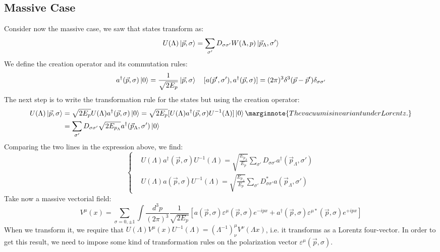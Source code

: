 \documentclass[../main.tex]{subfiles}
\begin{document}
\subsection{Massive Case}
Consider now the massive case, we saw that states transform as:
\[
U(\Lambda)\ket{\vec{p},\sigma}=\sum_{\sigma'}D_{\sigma\sigma'}W(\Lambda,p)\ket{\vec{p}_\Lambda,\sigma'}
\]
We define the creation operator and its commutation rules:
\[
a^\dagger(\vec{p},\sigma)\ket{0}=\frac{1}{\sqrt{2E_p}}\ket{\vec{p},\sigma} \quad [a(\vec{p}',\sigma'),a^\dagger(\vec{p},\sigma)]=(2\pi)^3\delta^3(\vec{p}-\vec{p}')\delta_{\sigma\sigma'}
\]
The next step is to write the transformation rule for the states but using the creation operator:
\begin{align*}
U(\Lambda)\ket{\vec{p},\sigma}&=\sqrt{2E_p}U(\Lambda)a^\dagger(\vec{p},\sigma)\ket{0}=\sqrt{2E_p}[U(\Lambda)a^\dagger(\vec{p},\sigma)U^{-1}(\Lambda)]\ket{0}\marginnote{The vacuum is invariant under Lorentz.}\\
&=\sum_{\sigma'}D_{\sigma\sigma'}\sqrt{2E_{p_\Lambda}}a^\dagger(\vec{p}_\Lambda,\sigma')\ket{0}
\end{align*}
Comparing the two lines in the expression above, we find:
\[
\left\{
\begin{aligned}
&U(\Lambda)a^\dagger(\vec{p},\sigma)U^{-1}(\Lambda)=\sqrt{\frac{E_{p_\Lambda}}{E_p}}\sum_{\sigma'}D_{\sigma\sigma'}a^\dagger(\vec{p}_\Lambda,\sigma')\\
&U(\Lambda)a(\vec{p},\sigma)U^{-1}(\Lambda)=\sqrt{\frac{E_{p_\Lambda}}{E_p}}\sum_{\sigma'}D_{\sigma\sigma'}^*a(\vec{p}_\Lambda,\sigma')
\end{aligned}
\right.
\]
Take now a massive vectorial field:
\[
V^\mu(x)=\sum_{\sigma=0,\pm1}\int\frac{d^3p}{(2\pi)^3}\frac{1}{\sqrt{2E_p}}\left[a(\vec{p},\sigma)\varepsilon^\mu(\vec{p},\sigma)e^{-ipx}+a^\dagger(\vec{p},\sigma)\varepsilon^{\mu*}(\vec{p},\sigma)e^{+ipx}\right]
\]
When we transform it, we require that $U(\Lambda)V^\mu(x)U^{-1}(\Lambda)=(\Lambda^{-1})^\mu_\nu V^\nu(\Lambda x)$, i.e. it transforms as a Lorentz four-vector. In order to get this result, we need to impose some kind of transformation rules on the polarization vector $\varepsilon^\mu(\vec{p},\sigma)$.
\end{document}
